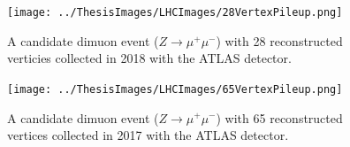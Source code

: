 \begin{figure}[ht!]
	\centering
	\texttt{[image: ../ThesisImages/LHCImages/28VertexPileup.png]}
	\caption[A candidate dimuon event ($Z\rightarrow \mu^+ \mu^-$) with 28 reconstructed vertices collected in 2018 with the ATLAS detector.]{ A candidate dimuon event ($Z\rightarrow \mu^+ \mu^-$) with 28 reconstructed verticies collected in 2018 with the ATLAS detector\cite{ATLASLumi}.
	}
	\label{fig:HighPileup}
\end{figure}

\begin{figure}[ht!]
	\centering
	\texttt{[image: ../ThesisImages/LHCImages/65VertexPileup.png]}
	\caption[A candidate dimuon event ($Z\rightarrow \mu^+ \mu^-$) with 65 reconstructed vertices collected in 2017 with the ATLAS detector.]{ A candidate dimuon event ($Z\rightarrow \mu^+ \mu^-$) with 65 reconstructed vertices collected in 2017 with the ATLAS detector\cite{ATLASLumi}.
	}
	\label{fig:HighPileup2}
\end{figure}

